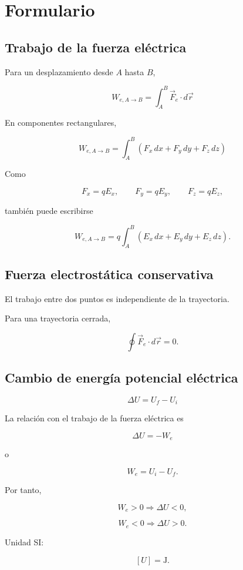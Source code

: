 \section{Formulario}

\subsection{Trabajo de la fuerza eléctrica}

Para un desplazamiento desde \(A\) hasta \(B\),

\[
\boxed{
W_{e,A\to B}
=
\int_A^B \vec F_e\cdot d\vec r
}
\]

En componentes rectangulares,

\[
\boxed{
W_{e,A\to B}
=
\int_A^B
\left(
F_x\,dx+F_y\,dy+F_z\,dz
\right)
}
\]

Como

\[
F_x=qE_x,\qquad
F_y=qE_y,\qquad
F_z=qE_z,
\]

también puede escribirse

\[
\boxed{
W_{e,A\to B}
=
q\int_A^B
\left(
E_x\,dx+E_y\,dy+E_z\,dz
\right)
}.
\]


\subsection{Fuerza electrostática conservativa}

El trabajo entre dos puntos es independiente de la trayectoria.

Para una trayectoria cerrada,

\[
\boxed{
\oint\vec F_e\cdot d\vec r=0
}.
\]


\subsection{Cambio de energía potencial eléctrica}

\[
\boxed{
\Delta U=U_f-U_i
}
\]

La relación con el trabajo de la fuerza eléctrica es

\[
\boxed{
\Delta U=-W_e
}
\]

o

\[
\boxed{
W_e=U_i-U_f
}.
\]

Por tanto,

\[
W_e>0
\Longrightarrow
\Delta U<0,
\]

\[
W_e<0
\Longrightarrow
\Delta U>0.
\]

Unidad SI:

\[
\boxed{[U]=\si{\joule}}.
\]


